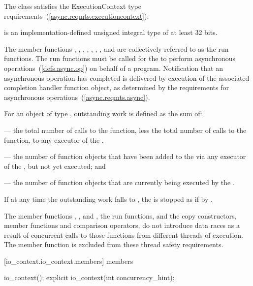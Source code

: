 \pnum
The class  satisfies the ExecutionContext type requirements~(\ref{async.reqmts.executioncontext}).

\pnum
{} is an implementation-defined unsigned integral type of at least 32 bits.

\pnum
The  member functions , , , , , , , and  are collectively referred to as the run functions. The run functions must be called for the  to perform asynchronous operations~(\ref{defs.async.op}) on behalf of a \Cpp program. Notification that an asynchronous operation has completed is delivered by execution of the associated completion handler function object, as determined by the requirements for asynchronous operations~(\ref{async.reqmts.async}).

\pnum
For an object of type , outstanding work is defined as the sum of:

\pnum
--- the total number of calls to the  function, less the total number of calls to the  function, to any executor of the .

\pnum
--- the number of function objects that have been added to the  via any executor of the , but not yet executed; and

\pnum
--- the number of function objects that are currently being executed by the .

\pnum
If at any time the outstanding work falls to , the  is stopped as if by .

\pnum
The  member functions , , and , the run functions, and the  copy constructors, member functions and comparison operators, do not introduce data races as a result of concurrent calls to those functions from different threads of execution. \enternote The  member function is excluded from these thread safety requirements. \exitnote


[io_context.io_context.members]{ members}

\begin{itemdecl}
io_context();
explicit io_context(int concurrency_hint);
\end{itemdecl}

